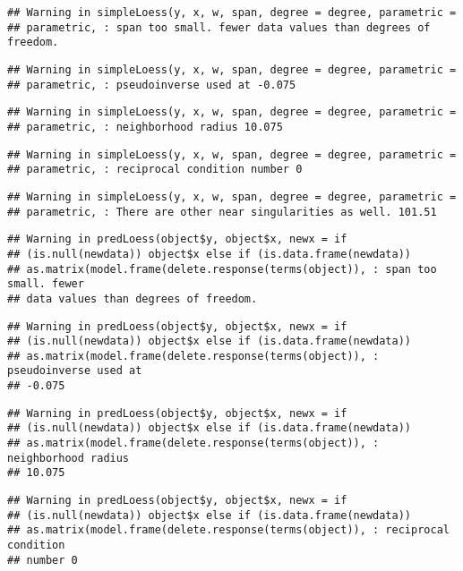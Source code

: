 \documentclass[
]{article}
\begin{document}
\begin{verbatim}
## Warning in simpleLoess(y, x, w, span, degree = degree, parametric =
## parametric, : span too small. fewer data values than degrees of freedom.
\end{verbatim}

\begin{verbatim}
## Warning in simpleLoess(y, x, w, span, degree = degree, parametric =
## parametric, : pseudoinverse used at -0.075
\end{verbatim}

\begin{verbatim}
## Warning in simpleLoess(y, x, w, span, degree = degree, parametric =
## parametric, : neighborhood radius 10.075
\end{verbatim}

\begin{verbatim}
## Warning in simpleLoess(y, x, w, span, degree = degree, parametric =
## parametric, : reciprocal condition number 0
\end{verbatim}

\begin{verbatim}
## Warning in simpleLoess(y, x, w, span, degree = degree, parametric =
## parametric, : There are other near singularities as well. 101.51
\end{verbatim}

\begin{verbatim}
## Warning in predLoess(object$y, object$x, newx = if
## (is.null(newdata)) object$x else if (is.data.frame(newdata))
## as.matrix(model.frame(delete.response(terms(object)), : span too small. fewer
## data values than degrees of freedom.
\end{verbatim}

\begin{verbatim}
## Warning in predLoess(object$y, object$x, newx = if
## (is.null(newdata)) object$x else if (is.data.frame(newdata))
## as.matrix(model.frame(delete.response(terms(object)), : pseudoinverse used at
## -0.075
\end{verbatim}

\begin{verbatim}
## Warning in predLoess(object$y, object$x, newx = if
## (is.null(newdata)) object$x else if (is.data.frame(newdata))
## as.matrix(model.frame(delete.response(terms(object)), : neighborhood radius
## 10.075
\end{verbatim}

\begin{verbatim}
## Warning in predLoess(object$y, object$x, newx = if
## (is.null(newdata)) object$x else if (is.data.frame(newdata))
## as.matrix(model.frame(delete.response(terms(object)), : reciprocal condition
## number 0
\end{verbatim}
\end{document}
